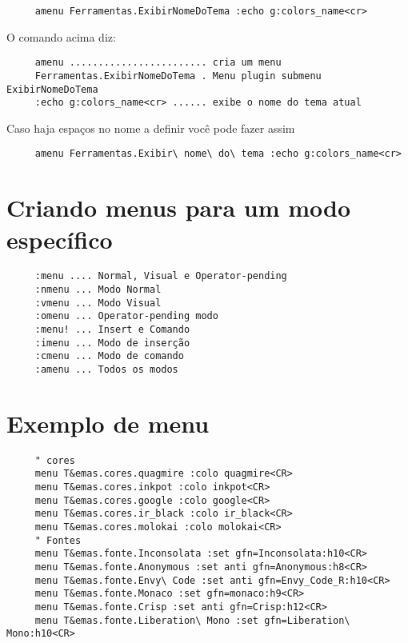 \begin{verbatim}
     amenu Ferramentas.ExibirNomeDoTema :echo g:colors_name<cr>
\end{verbatim}

O comando acima diz:

\begin{verbatim}
     amenu ........................ cria um menu
     Ferramentas.ExibirNomeDoTema . Menu plugin submenu ExibirNomeDoTema
     :echo g:colors_name<cr> ...... exibe o nome do tema atual
\end{verbatim}

Caso haja espaços no nome a definir você pode fazer assim

\begin{verbatim}
     amenu Ferramentas.Exibir\ nome\ do\ tema :echo g:colors_name<cr>
\end{verbatim}

\section{Criando menus para um modo específico}
\label{Criando menus para um modo específico}

\begin{verbatim}
     :menu .... Normal, Visual e Operator-pending
     :nmenu ... Modo Normal
     :vmenu ... Modo Visual
     :omenu ... Operator-pending modo
     :menu! ... Insert e Comando
     :imenu ... Modo de inserção
     :cmenu ... Modo de comando
     :amenu ... Todos os modos
\end{verbatim}

\section{Exemplo de menu}
\label{Exemplo de menu}

\begin{verbatim}
     " cores
     menu T&emas.cores.quagmire :colo quagmire<CR>
     menu T&emas.cores.inkpot :colo inkpot<CR>
     menu T&emas.cores.google :colo google<CR>
     menu T&emas.cores.ir_black :colo ir_black<CR>
     menu T&emas.cores.molokai :colo molokai<CR>
     " Fontes
     menu T&emas.fonte.Inconsolata :set gfn=Inconsolata:h10<CR>
     menu T&emas.fonte.Anonymous :set anti gfn=Anonymous:h8<CR>
     menu T&emas.fonte.Envy\ Code :set anti gfn=Envy_Code_R:h10<CR>
     menu T&emas.fonte.Monaco :set gfn=monaco:h9<CR>
     menu T&emas.fonte.Crisp :set anti gfn=Crisp:h12<CR>
     menu T&emas.fonte.Liberation\ Mono :set gfn=Liberation\ Mono:h10<CR>
\end{verbatim}


